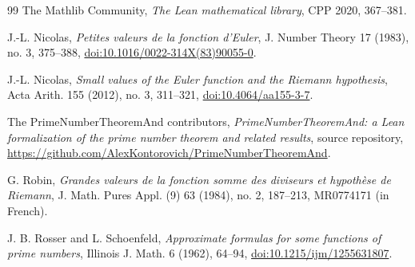 \documentclass[11pt]{amsart}
\theoremstyle{definition}
\theoremstyle{remark}
\numberwithin{equation}{section}
\begin{document}
\begin{thebibliography}{99}
The Mathlib Community,
\emph{The Lean mathematical library},
CPP 2020, 367--381.

J.-L. Nicolas,
\emph{Petites valeurs de la fonction d'Euler},
J. Number Theory 17 (1983), no. 3, 375--388,
\href{https://doi.org/10.1016/0022-314X(83)90055-0}
{doi:10.1016/0022-314X(83)90055-0}.

J.-L. Nicolas,
\emph{Small values of the Euler function and the Riemann hypothesis},
Acta Arith. 155 (2012), no. 3, 311--321,
\href{https://doi.org/10.4064/aa155-3-7}{doi:10.4064/aa155-3-7}.

The PrimeNumberTheoremAnd contributors,
\emph{PrimeNumberTheoremAnd: a Lean formalization of the prime number theorem
and related results},
source repository,
\url{https://github.com/AlexKontorovich/PrimeNumberTheoremAnd}.

G. Robin,
\emph{Grandes valeurs de la fonction somme des diviseurs et hypoth\`ese de
Riemann},
J. Math. Pures Appl. (9) 63 (1984), no. 2, 187--213, MR0774171
(in French).

J. B. Rosser and L. Schoenfeld,
\emph{Approximate formulas for some functions of prime numbers},
Illinois J. Math. 6 (1962), 64--94,
\href{https://doi.org/10.1215/ijm/1255631807}
{doi:10.1215/ijm/1255631807}.

\end{thebibliography}
\end{document}
